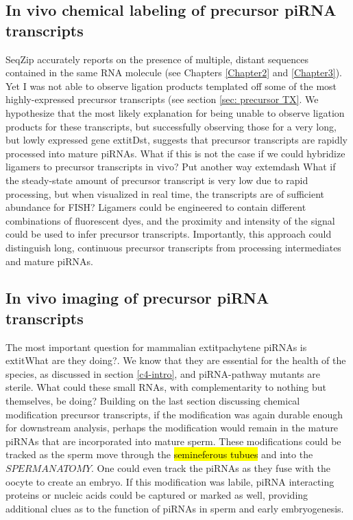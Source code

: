   \subsection{In vivo chemical labeling of precursor piRNA transcripts}
    
    SeqZip accurately reports on the presence of multiple, distant sequences contained in the same RNA molecule (see Chapters \ref{Chapter2} and \ref{Chapter3}). Yet I was not able to observe ligation products templated off some of the most highly-expressed precursor transcripts (see section \ref{sec: precursor TX}. We hypothesize that the most likely explanation for being unable to observe ligation products for these transcripts, but successfully observing those for a very long, but lowly expressed gene   extit{Dst}, suggests that precursor transcripts are rapidly processed into mature piRNAs. What if this is not the case if we could hybridize ligamers to precursor transcripts in vivo? Put another way  extemdash What if the steady-state amount of precursor transcript is very low due to rapid processing, but when visualized in real time, the transcripts are of sufficient abundance for FISH? Ligamers could be engineered to contain different combinations of fluorescent dyes, and the proximity and intensity of the signal could be used to infer precursor transcripts. Importantly, this approach could distinguish long, continuous precursor transcripts from processing intermediates and mature piRNAs.

  \subsection{In vivo imaging of precursor piRNA transcripts}
    The most important question for mammalian   extit{pachytene} piRNAs is   extit{What are they doing?}. We know that they are essential for the health of the species, as discussed in section \ref{c4-intro}, and piRNA-pathway mutants are sterile. What could these small RNAs, with complementarity to nothing but themselves, be doing? Building on the last section discussing chemical modification precursor transcripts, if the modification was again durable enough for downstream analysis, perhaps the modification would remain in the mature piRNAs that are incorporated into mature sperm. These modifications could be tracked as the sperm move through the \hl{semineferous tubues} and into the $SPERM ANATOMY$. One could even track the piRNAs as they fuse with the oocyte to create an embryo. If this modification was labile, piRNA interacting proteins or nucleic acids could be captured or marked as well, providing additional clues as to the function of piRNAs in sperm and early embryogenesis.

